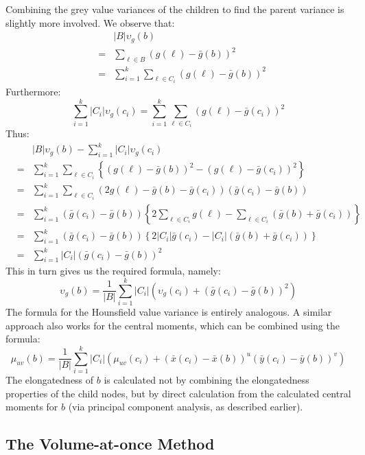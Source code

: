 \noindent Combining the grey value variances of the children to find the parent variance is slightly more involved. We observe that:
%
\begin{eqnarray*}
&   & |B|\upsilon_g(b) \\
& = & \sum_{\ell \in B} (g(\ell) - \bar{g}(b))^2 \\
& = & \sum_{i=1}^k \sum_{\ell \in C_i} (g(\ell) - \bar{g}(b))^2
\end{eqnarray*}
%
\noindent Furthermore:
%
\[
\sum_{i=1}^k |C_i|\upsilon_g(c_i) = \sum_{i=1}^k \sum_{\ell \in C_i} (g(\ell) - \bar{g}(c_i))^2
\]
%
\noindent Thus:
%
\begin{eqnarray*}
&   & |B|\upsilon_g(b) - \sum_{i=1}^k |C_i|\upsilon_g(c_i) \\
%
& = & \sum_{i=1}^k \sum_{\ell \in C_i} \left\{ (g(\ell) - \bar{g}(b))^2 - (g(\ell) - \bar{g}(c_i))^2 \right\} \\
%
& = & \sum_{i=1}^k \sum_{\ell \in C_i} (2g(\ell) - \bar{g}(b) - \bar{g}(c_i))(\bar{g}(c_i) - \bar{g}(b)) \\
%
& = & \sum_{i=1}^k (\bar{g}(c_i) - \bar{g}(b)) \left\{ 2 \sum_{\ell \in C_i} g(\ell) - \sum_{\ell \in C_i} (\bar{g}(b) + \bar{g}(c_i)) \right\} \\
%
& = & \sum_{i=1}^k (\bar{g}(c_i) - \bar{g}(b)) \left\{ 2|C_i|\bar{g}(c_i) - |C_i|(\bar{g}(b) + \bar{g}(c_i)) \right\} \\
%
& = & \sum_{i=1}^k |C_i|(\bar{g}(c_i) - \bar{g}(b))^2
\end{eqnarray*}
%
\noindent This in turn gives us the required formula, namely:
%
\[
\upsilon_g(b) = \frac{1}{|B|} \sum_{i=1}^k |C_i| (\upsilon_g(c_i) + (\bar{g}(c_i) - \bar{g}(b))^2)
\]
%
\noindent The formula for the Hounsfield value variance is entirely analogous. A similar approach also works for the central moments, which can be combined using the formula:
%
\[
\mu_{uv}(b) = \frac{1}{|B|} \sum_{i=1}^k |C_i| (\mu_{uv}(c_i) + (\bar{x}(c_i) - \bar{x}(b))^u (\bar{y}(c_i) - \bar{y}(b))^v)
\]
%
\noindent The elongatedness of $b$ is calculated not by combining the elongatedness properties of the child nodes, but by direct calculation from the calculated central moments for $b$ (via principal component analysis, as described earlier).

\subsection{The Volume-at-once Method}
\label{subsec:segmentation-ipfconstruction-volumeatonce}

